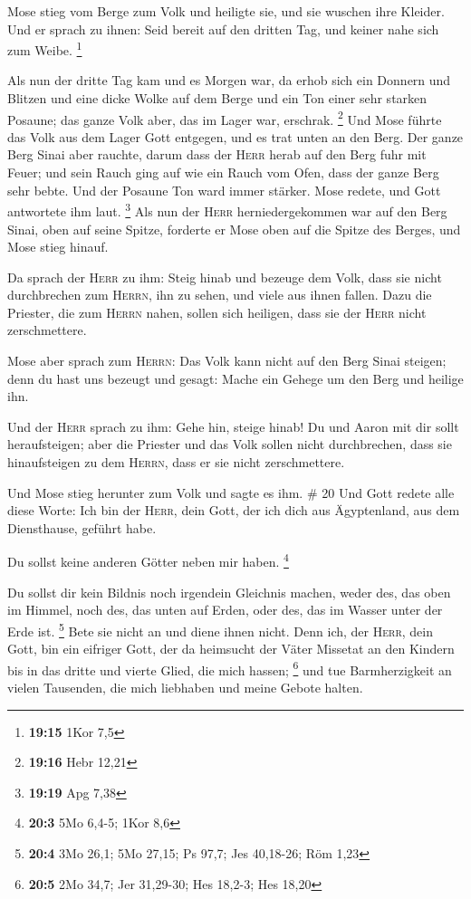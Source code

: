  Mose stieg vom Berge zum Volk und heiligte sie, und sie
wuschen ihre Kleider.  Und er sprach zu ihnen: Seid
bereit auf den dritten Tag, und keiner nahe sich zum Weibe. \footnote{\textbf{19:15}
  1Kor 7,5}

 Als nun der dritte Tag kam und es Morgen war, da erhob
sich ein Donnern und Blitzen und eine dicke Wolke auf dem Berge und ein
Ton einer sehr starken Posaune; das ganze Volk aber, das im Lager war,
erschrak. \footnote{\textbf{19:16} Hebr 12,21}  Und Mose
führte das Volk aus dem Lager Gott entgegen, und es trat unten an den
Berg.  Der ganze Berg Sinai aber rauchte, darum dass der
\textsc{Herr} herab auf den Berg fuhr mit Feuer; und sein Rauch ging auf
wie ein Rauch vom Ofen, dass der ganze Berg sehr bebte. 
Und der Posaune Ton ward immer stärker. Mose redete, und Gott antwortete
ihm laut. \footnote{\textbf{19:19} Apg 7,38}  Als nun der
\textsc{Herr} herniedergekommen war auf den Berg Sinai, oben auf seine
Spitze, forderte er Mose oben auf die Spitze des Berges, und Mose stieg
hinauf.

 Da sprach der \textsc{Herr} zu ihm: Steig hinab und
bezeuge dem Volk, dass sie nicht durchbrechen zum \textsc{Herrn}, ihn zu
sehen, und viele aus ihnen fallen.  Dazu die Priester,
die zum \textsc{Herrn} nahen, sollen sich heiligen, dass sie der
\textsc{Herr} nicht zerschmettere.

 Mose aber sprach zum \textsc{Herrn}: Das Volk kann nicht
auf den Berg Sinai steigen; denn du hast uns bezeugt und gesagt: Mache
ein Gehege um den Berg und heilige ihn.

 Und der \textsc{Herr} sprach zu ihm: Gehe hin, steige
hinab! Du und Aaron mit dir sollt heraufsteigen; aber die Priester und
das Volk sollen nicht durchbrechen, dass sie hinaufsteigen zu dem
\textsc{Herrn}, dass er sie nicht zerschmettere.

 Und Mose stieg herunter zum Volk und sagte es ihm. \# 20
 Und Gott redete alle diese Worte:  Ich bin
der \textsc{Herr}, dein Gott, der ich dich aus Ägyptenland, aus dem
Diensthause, geführt habe.

 Du sollst keine anderen Götter neben mir haben.
\footnote{\textbf{20:3} 5Mo 6,4-5; 1Kor 8,6}

 Du sollst dir kein Bildnis noch irgendein Gleichnis
machen, weder des, das oben im Himmel, noch des, das unten auf Erden,
oder des, das im Wasser unter der Erde ist. \footnote{\textbf{20:4} 3Mo
  26,1; 5Mo 27,15; Ps 97,7; Jes 40,18-26; Röm 1,23}  Bete
sie nicht an und diene ihnen nicht. Denn ich, der \textsc{Herr}, dein
Gott, bin ein eifriger Gott, der da heimsucht der Väter Missetat an den
Kindern bis in das dritte und vierte Glied, die mich hassen; \footnote{\textbf{20:5}
  2Mo 34,7; Jer 31,29-30; Hes 18,2-3; Hes 18,20}  und tue
Barmherzigkeit an vielen Tausenden, die mich liebhaben und meine Gebote
halten.

